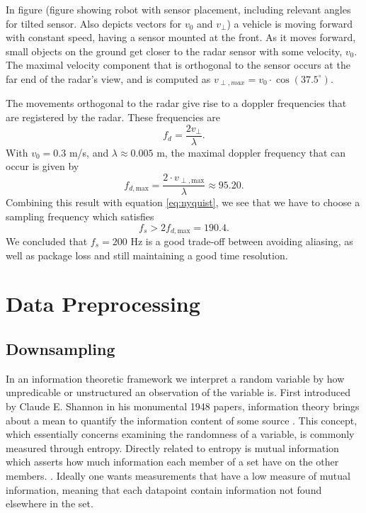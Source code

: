 In figure (figure showing robot with sensor placement, including relevant angles for tilted sensor. Also depicts vectors for $v_0$ and $v_\perp$) a vehicle is moving forward with constant speed, having a sensor mounted at the front. As it moves forward, small objects on the ground get closer to the radar sensor with some velocity, $v_0$. The maximal velocity component that is orthogonal to the sensor occurs at the far end of the radar's view, and is computed as $v_{\perp, max} = v_0\cdot \cos(37.5^\circ)$.

The movements orthogonal to the radar give rise to a doppler frequencies that are registered by the radar. These frequencies are \citep{lien_gillian_karagozler_amihood_schwesig_olson_raja_poupyrev_2016}
\begin{equation}
	f_{d} = \frac{2v_\perp}{\lambda}.
\end{equation}
With $v_0=0.3$ m/s, and $\lambda \approx 0.005$ m, the maximal doppler frequency that can occur is given by 
\begin{equation}
	f_{d,\textrm{max}} = \frac{2\cdot v_{\perp, \textrm{max}}}{\lambda} \approx 95.20.
\end{equation}
Combining this result with equation \eqref{eq:nyquist}, we see that we have to choose a sampling frequency which satisfies
\begin{equation}
	f_s > 2f_{d,\textrm{max}} = 190.4.
\end{equation}
We concluded that $f_s=200$ Hz is a good trade-off between avoiding aliasing, as well as package loss and still maintaining a good time resolution.

\section{Data Preprocessing}
\subsection{Downsampling}

In an information theoretic framework we interpret a random variable by how unpredicable or unstructured an observation of the variable is\citep{anderson_johnnesson_2006}. First introduced by Claude E. Shannon in his monumental 1948 papers, information theory brings about a mean to quantify the information content of some source \citep{shannon_1948}. This concept, which essentially concerns examining the randomness of a variable, is commonly measured through entropy. Directly related to entropy is mutual information which asserts how much information each member of a set have on the other members. \citep{hyvasrinen_karhunen_oja_2004}. Ideally one wants measurements that have a low measure of mutual information, meaning that each datapoint contain information not found elsewhere in the set. 

